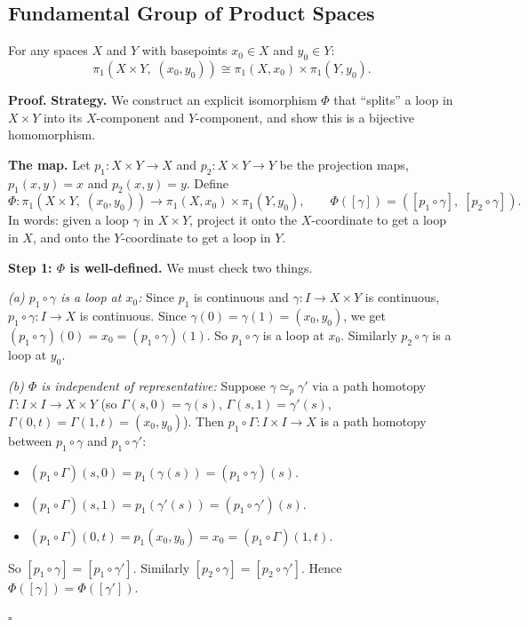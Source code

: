 \documentclass[11pt]{report}
\renewenvironment{proof}[1][Proof]{\noindent\textbf{#1.} }{\hfill$\square$\par\vspace{5pt}}
\begin{document}
\subsection{Fundamental Group of Product Spaces}

\begin{thmbox}
For any spaces $X$ and $Y$ with basepoints $x_0 \in X$ and $y_0 \in Y$:
\[\pi_1(X \times Y, \; (x_0, y_0)) \cong \pi_1(X, x_0) \times \pi_1(Y, y_0).\]
\end{thmbox}

\begin{proof}
\textbf{Strategy.} We construct an explicit isomorphism $\Phi$ that ``splits'' a loop in $X \times Y$ into its $X$-component and $Y$-component, and show this is a bijective homomorphism.

\textbf{The map.} Let $p_1: X \times Y \to X$ and $p_2: X \times Y \to Y$ be the projection maps, $p_1(x,y) = x$ and $p_2(x,y) = y$. Define
\[\Phi: \pi_1(X \times Y, \; (x_0, y_0)) \to \pi_1(X, x_0) \times \pi_1(Y, y_0), \qquad \Phi([\gamma]) = ([p_1 \circ \gamma], \; [p_2 \circ \gamma]).\]
In words: given a loop $\gamma$ in $X \times Y$, project it onto the $X$-coordinate to get a loop in $X$, and onto the $Y$-coordinate to get a loop in $Y$.

\textbf{Step 1: $\Phi$ is well-defined.} We must check two things.

\textit{(a) $p_1 \circ \gamma$ is a loop at $x_0$:} Since $p_1$ is continuous and $\gamma: I \to X \times Y$ is continuous, $p_1 \circ \gamma: I \to X$ is continuous. Since $\gamma(0) = \gamma(1) = (x_0, y_0)$, we get $(p_1 \circ \gamma)(0) = x_0 = (p_1 \circ \gamma)(1)$. So $p_1 \circ \gamma$ is a loop at $x_0$. Similarly $p_2 \circ \gamma$ is a loop at $y_0$.

\textit{(b) $\Phi$ is independent of representative:} Suppose $\gamma \simeq_p \gamma'$ via a path homotopy $\Gamma: I \times I \to X \times Y$ (so $\Gamma(s,0) = \gamma(s)$, $\Gamma(s,1) = \gamma'(s)$, $\Gamma(0,t) = \Gamma(1,t) = (x_0,y_0)$). Then $p_1 \circ \Gamma: I \times I \to X$ is a path homotopy between $p_1 \circ \gamma$ and $p_1 \circ \gamma'$:
\begin{itemize}[nosep]
    \item $(p_1 \circ \Gamma)(s, 0) = p_1(\gamma(s)) = (p_1 \circ \gamma)(s)$. \checkmark
    \item $(p_1 \circ \Gamma)(s, 1) = p_1(\gamma'(s)) = (p_1 \circ \gamma')(s)$. \checkmark
    \item $(p_1 \circ \Gamma)(0, t) = p_1(x_0, y_0) = x_0 = (p_1 \circ \Gamma)(1, t)$. \checkmark
\end{itemize}
So $[p_1 \circ \gamma] = [p_1 \circ \gamma']$. Similarly $[p_2 \circ \gamma] = [p_2 \circ \gamma']$. Hence $\Phi([\gamma]) = \Phi([\gamma'])$.


\end{proof}
\end{document}
